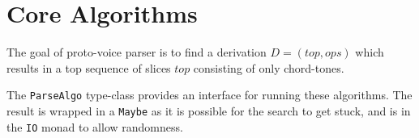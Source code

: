\documentclass[12pt,a4paper,twoside,openany]{report} \usepackage[pdfborder={0 0 0}]{hyperref}    %
\theoremstyle{definition} \newtheorem{definition}{Definition}[section]
\begin{document}
%
%
%
%
%
%
%

\section{Core Algorithms} 
\label{sec:baselineAlgorithms}

The goal of proto-voice parser is to find a derivation $D= (top, ops)$ which results in
a top sequence of slices $top$ consisting of only chord-tones. 

The \texttt{ParseAlgo} type-class provides an interface for running these algorithms. The result is wrapped in
a \texttt{Maybe} as it is possible for the search to get stuck, and is in the \texttt{IO} monad to allow
randomness.
\end{document}
